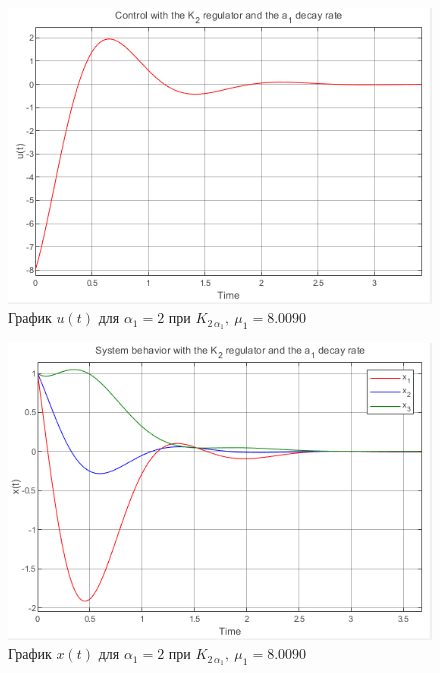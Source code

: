 \documentclass[a4paper, 12pt]{article}
\begin{document}
    \newpage
    \vspace*{0.01mm}
    \begin{figure}[H]
        \centering
        \includegraphics{1task_K2a1_u.png}
        \captionsetup{skip=0pt}
        \caption{График $u(t)$ для $\alpha_1=2$ при $K_{2\,\alpha_1},\ \mu_1=8.0090$}
        \label{fig:1task_K2a1_u}
    \end{figure}
    \begin{figure}[H]
        \centering
        \includegraphics{1task_K2a1_x.png}
        \captionsetup{skip=0pt}
        \caption{График $x(t)$ для $\alpha_1=2$ при $K_{2\,\alpha_1},\ \mu_1=8.0090$}
        \label{fig:1task_K2a1_x}
    \end{figure}
    \newpage
    \vspace*{0.01mm}
\end{document}
